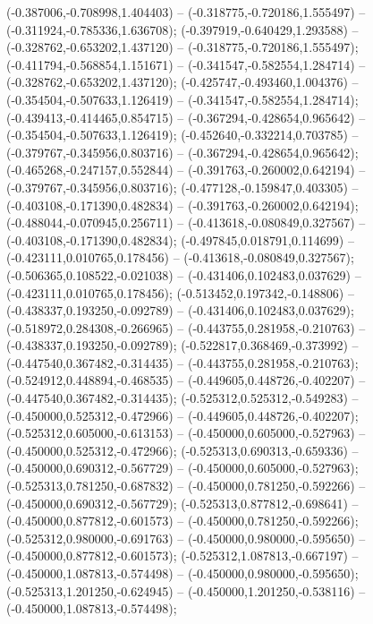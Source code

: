  (-0.387006,-0.708998,1.404403) -- (-0.318775,-0.720186,1.555497) -- (-0.311924,-0.785336,1.636708);
 (-0.397919,-0.640429,1.293588) -- (-0.328762,-0.653202,1.437120) -- (-0.318775,-0.720186,1.555497);
 (-0.411794,-0.568854,1.151671) -- (-0.341547,-0.582554,1.284714) -- (-0.328762,-0.653202,1.437120);
 (-0.425747,-0.493460,1.004376) -- (-0.354504,-0.507633,1.126419) -- (-0.341547,-0.582554,1.284714);
 (-0.439413,-0.414465,0.854715) -- (-0.367294,-0.428654,0.965642) -- (-0.354504,-0.507633,1.126419);
 (-0.452640,-0.332214,0.703785) -- (-0.379767,-0.345956,0.803716) -- (-0.367294,-0.428654,0.965642);
 (-0.465268,-0.247157,0.552844) -- (-0.391763,-0.260002,0.642194) -- (-0.379767,-0.345956,0.803716);
 (-0.477128,-0.159847,0.403305) -- (-0.403108,-0.171390,0.482834) -- (-0.391763,-0.260002,0.642194);
 (-0.488044,-0.070945,0.256711) -- (-0.413618,-0.080849,0.327567) -- (-0.403108,-0.171390,0.482834);
 (-0.497845,0.018791,0.114699) -- (-0.423111,0.010765,0.178456) -- (-0.413618,-0.080849,0.327567);
 (-0.506365,0.108522,-0.021038) -- (-0.431406,0.102483,0.037629) -- (-0.423111,0.010765,0.178456);
 (-0.513452,0.197342,-0.148806) -- (-0.438337,0.193250,-0.092789) -- (-0.431406,0.102483,0.037629);
 (-0.518972,0.284308,-0.266965) -- (-0.443755,0.281958,-0.210763) -- (-0.438337,0.193250,-0.092789);
 (-0.522817,0.368469,-0.373992) -- (-0.447540,0.367482,-0.314435) -- (-0.443755,0.281958,-0.210763);
 (-0.524912,0.448894,-0.468535) -- (-0.449605,0.448726,-0.402207) -- (-0.447540,0.367482,-0.314435);
 (-0.525312,0.525312,-0.549283) -- (-0.450000,0.525312,-0.472966) -- (-0.449605,0.448726,-0.402207);
 (-0.525312,0.605000,-0.613153) -- (-0.450000,0.605000,-0.527963) -- (-0.450000,0.525312,-0.472966);
 (-0.525313,0.690313,-0.659336) -- (-0.450000,0.690312,-0.567729) -- (-0.450000,0.605000,-0.527963);
 (-0.525313,0.781250,-0.687832) -- (-0.450000,0.781250,-0.592266) -- (-0.450000,0.690312,-0.567729);
 (-0.525313,0.877812,-0.698641) -- (-0.450000,0.877812,-0.601573) -- (-0.450000,0.781250,-0.592266);
 (-0.525312,0.980000,-0.691763) -- (-0.450000,0.980000,-0.595650) -- (-0.450000,0.877812,-0.601573);
 (-0.525312,1.087813,-0.667197) -- (-0.450000,1.087813,-0.574498) -- (-0.450000,0.980000,-0.595650);
 (-0.525313,1.201250,-0.624945) -- (-0.450000,1.201250,-0.538116) -- (-0.450000,1.087813,-0.574498);
